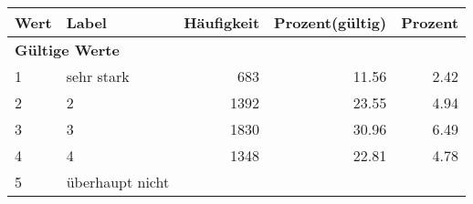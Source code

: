      \begin{longtable}{lXrrr}
     \toprule
     \textbf{Wert} & \textbf{Label} & \textbf{Häufigkeit} & \textbf{Prozent(gültig)} & \textbf{Prozent} \\
     \endhead
     \midrule
     \multicolumn{5}{l}{\textbf{Gültige Werte}}\\

     1 &
     \multicolumn{1}{X}{ sehr stark   } &


       \num{683} &
       \num[round-mode=places,round-precision=2]{11,56} &
         \num[round-mode=places,round-precision=2]{2,42} \\

     2 &
     \multicolumn{1}{X}{ 2   } &


       \num{1392} &
       \num[round-mode=places,round-precision=2]{23,55} &
         \num[round-mode=places,round-precision=2]{4,94} \\

     3 &
     \multicolumn{1}{X}{ 3   } &


       \num{1830} &
       \num[round-mode=places,round-precision=2]{30,96} &
         \num[round-mode=places,round-precision=2]{6,49} \\

     4 &
     \multicolumn{1}{X}{ 4   } &


       \num{1348} &
       \num[round-mode=places,round-precision=2]{22,81} &
         \num[round-mode=places,round-precision=2]{4,78} \\

     5 &
     \multicolumn{1}{X}{ überhaupt nicht   } &



\end{longtable}
